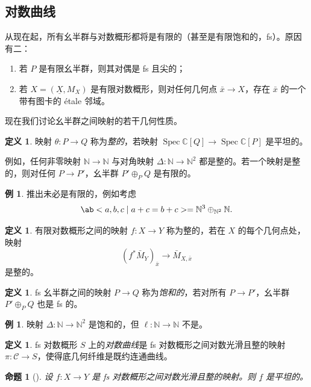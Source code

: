 \documentclass{amsart}
\newtheorem{prop}[thm]{命题}
\theoremstyle{definition}
\newtheorem{defn}[thm]{定义}
\newtheorem{exm}[thm]{例}
\theoremstyle{remark}
\theoremstyle{plain}
\theoremstyle{definition}
\theoremstyle{remark}
\newcommand{\N}{\mathbb{N}}
\newcommand{\C}{\mathbb{C}}
\newcommand{\mc}[1]{\mathcal{#1}}
\newcommand{\ul}[1]{\underline{#1}}
\newcommand{\1}{\mathbf{1}}
\newcommand{\2}{\mathbf{2}}
\newcommand{\3}{\mathbf{3}}
\DeclareMathOperator{\Spec}{Spec}
\begin{document}
\subsection{对数曲线}%
\label{sub:Log curves}

从现在起，所有幺半群与对数概形都将是有限的（甚至是有限饱和的，fs）。原因有二：
\begin{enumerate}
    \item 若 \(P\) 是有限幺半群，则其对偶是 fs 且尖的；
    \item 若 \(X = (\ul{X}, M_X)\) 是有限对数概形，则对任何几何点 \(\bar{x} \to X\)，存在 \(\bar{x}\) 的一个带有图卡的 \'etale 邻域。
\end{enumerate}

现在我们讨论幺半群之间映射的若干几何性质。
\begin{defn}
    映射 \(\theta \colon P \to Q\) 称为\textit{整的}，若映射 \(\Spec\C[Q] \to \Spec \C[P]\) 是平坦的。
\end{defn}

例如，任何非零映射 \(\N \to \N\) 与对角映射 \(\Delta \colon\N \to \N^2\) 都是整的。若一个映射是整的，则对任何 \(P \to P'\)，幺半群 \(P' \oplus_P Q\) 是有限的。

\begin{exm}
    推出未必是有限的，例如考虑
    \[ \ab< a ,b,c \mid a+c=b+c> = \N^3 \oplus_{\N^2} \N. \]
\end{exm}

\begin{defn}
    有限对数概形之间的映射 \(f \colon X \to Y\) 称为整的，若在 \(X\) 的每个几何点处，映射
    \[ (f^*\bar{M}_Y)_{\bar{x}} \to \bar{M}_{X,\bar{x}} \]
    是整的。
\end{defn}

\begin{defn}
    fs 幺半群之间的映射 \(P \to Q\) 称为\textit{饱和的}，若对所有 \(P \to P'\)，幺半群 \(P' \oplus_P Q\) 也是 fs 的。
\end{defn}

\begin{exm}
    映射 \(\Delta \colon \N \to \N^2\) 是饱和的，但 \(\ell \colon \N \to \N\) 不是。
\end{exm}

\begin{defn}
    fs 对数概形 \(S\) 上的\textit{对数曲线}是 fs 对数概形之间对数光滑且整的映射 \(\pi \colon \mc{C} \to S\)，使得底几何纤维是既约连通曲线。
\end{defn}

\begin{prop}[{\cite{Kato1989}}]
    设 \(f \colon X \to Y\) 是 fs 对数概形之间对数光滑且整的映射。则 \(\ul{f}\) 是平坦的。
\end{prop}
\end{document}
